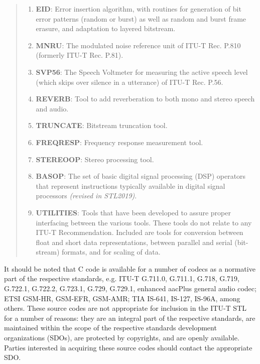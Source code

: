 \begin{quote}
\begin{enumerate}
\item {\bf EID}: Error insertion algorithm, with routines for generation of bit error patterns (random or burst) as well as random and burst frame erasure, and adaptation to layered bitstream.

\item {\bf MNRU}: The modulated noise reference unit of ITU-T Rec. P.810 (formerly ITU-T Rec. P.81).

\item {\bf SVP56}: The Speech Voltmeter for measuring the active speech level (which skips over silence in a utterance) of ITU-T Rec. P.56.
        
\item {\bf REVERB}: Tool to add reverberation to both mono and stereo speech and audio.
        
\item {\bf TRUNCATE}: Bitstream truncation tool.
        
\item {\bf FREQRESP}: Frequency response measurement tool.
        
\item {\bf STEREOOP}: Stereo processing tool.
        
\item {\bf BASOP}: The set of basic digital signal processing (DSP) operators that represent instructions typically available in digital signal processors \emph{(revised in STL2019)}.
        
\item {\bf UTILITIES}: Tools that have been developed to assure proper interfacing between the various tools.
These tools do not relate to any ITU-T Recommendation.
Included are tools for conversion between float and short data representations, between parallel and serial (bit-stream) formats, and for scaling of data.

\end{enumerate}
\end{quote}

It should be noted that C code is available for a number of codecs as
a normative part of the respective standards, e.g. ITU-T G.711.0,
G.711.1, G.718, G.719, G.722.1, G.722.2, G.723.1, G.729, G.729.1,
enhanced aacPlus general audio codec; ETSI GSM-HR, GSM-EFR, GSM-AMR;
TIA IS-641, IS-127, IS-96A, among others. These source codes are not
appropriate for inclusion in the ITU-T STL for a number of reasons:
they are an integral part of the respective standards, are maintained
within the scope of the respective standards development organizations
(SDOs), are protected by copyrights, and are openly available. Parties
interested in acquiring these source codes should contact the
appropriate SDO.


